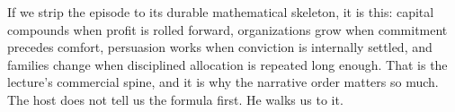 If we strip the episode to its durable mathematical skeleton, it is this: capital compounds when profit is rolled forward, organizations grow when commitment precedes comfort, persuasion works when conviction is internally settled, and families change when disciplined allocation is repeated long enough. That is the lecture's commercial spine, and it is why the narrative order matters so much. The host does not tell us the formula first. He walks us to it.